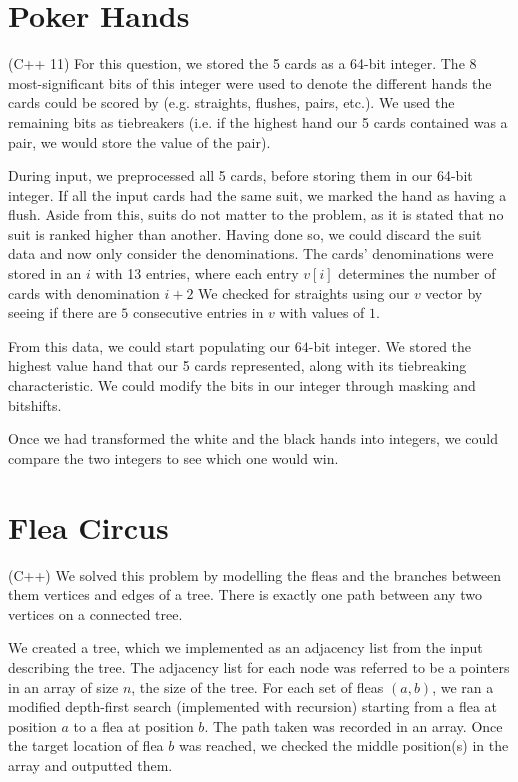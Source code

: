 \documentclass{article}
\begin{document}
\section{Poker Hands}
(C++ 11) For this question, we stored the 5 cards as a 64-bit integer. 
The 8 most-significant bits of this integer were used to denote the different hands the cards could be scored by (e.g. straights, flushes, pairs, etc.). 
We used the remaining bits as tiebreakers (i.e. if the highest hand our 5 cards contained was a pair, we would store the value of the pair).
\par
During input, we preprocessed all 5 cards, before storing them in our 64-bit integer. 
If all the input cards had the same suit, we marked the hand as having a flush. 
Aside from this, suits do not matter to the problem, as it is stated that no suit is ranked higher than another.
Having done so, we could discard the suit data and now only consider the denominations. 
The cards' denominations were stored in an $i$ with 13 entries, where each entry $v[i]$ determines the number of cards with denomination $i+2$
We checked for straights using our $v$ vector by seeing if there are $5$ consecutive entries in $v$ with values of $1$.
\par 
From this data, we could start populating our $64$-bit integer. 
We stored the highest value hand that our 5 cards represented, along with its tiebreaking characteristic.
We could modify the bits in our integer through masking and bitshifts.
\par
Once we had transformed the white and the black hands into integers, we could compare the two integers to see which one would win.

\section{Flea Circus}
(C++) We solved this problem by modelling the fleas and the branches between them vertices and edges of a tree. 
There is exactly one path between any two vertices on a connected tree. 
\par
We created a tree, which we implemented as an adjacency list from the input describing the tree. The adjacency list for each node was referred to be a pointers in an array of size $n$, the size of the tree.
For each set of fleas $(a,b)$, we ran a modified depth-first search (implemented with recursion) starting from a flea at position $a$ to a flea at position $b$.
The path taken was recorded in an array.
Once the target location of flea $b$ was reached, we checked the middle position(s) in the array and outputted them.
\end{document}
